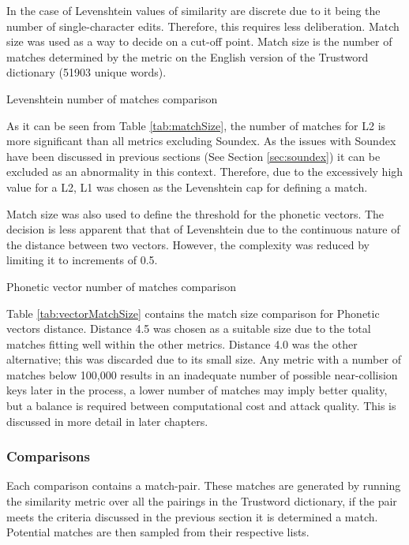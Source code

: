 In the case of Levenshtein values of similarity are discrete due to it being the number of single-character edits. Therefore, this requires less deliberation. Match size was used as a way to decide on a cut-off point. Match size is the number of matches determined by the metric on the English version of the Trustword dictionary (51903 unique words).

\begin{table}[h!]
    \centering
    
    \caption{Levenshtein number of matches comparison}
    \label{tab:matchSize}
\end{table}

As it can be seen from Table \ref{tab:matchSize}, the number of matches for L2 is more significant than all metrics excluding Soundex. As the issues with Soundex have been discussed in previous sections (See Section \ref{sec:soundex}) it can be excluded as an abnormality in this context. Therefore, due to the excessively high value for a L2, L1 was chosen as the Levenshtein cap for defining a match.

Match size was also used to define the threshold for the phonetic vectors. The decision is less apparent that that of Levenshtein due to the continuous nature of the distance between two vectors. However, the complexity was reduced by limiting it to increments of 0.5.

\begin{table}[h!]
    \centering
    
    \caption{Phonetic vector number of matches comparison}
    \label{tab:vectorMatchSize}
\end{table}

Table \ref{tab:vectorMatchSize} contains the match size comparison for Phonetic vectors distance. Distance 4.5 was chosen as a suitable size due to the total matches fitting well within the other metrics. Distance 4.0 was the other alternative; this was discarded due to its small size. Any metric with a number of matches below 100,000 results in an inadequate number of possible near-collision keys later in the process, a lower number of matches may imply better quality, but a balance is required between computational cost and attack quality. This is discussed in more detail in later chapters.

\subsubsection{Comparisons}
\label{sec:exp1_comparison}
Each comparison contains a match-pair. These matches are generated by running the similarity metric over all the pairings in the Trustword dictionary, if the pair meets the criteria discussed in the previous section it is determined a match. Potential matches are then sampled from their respective lists.

